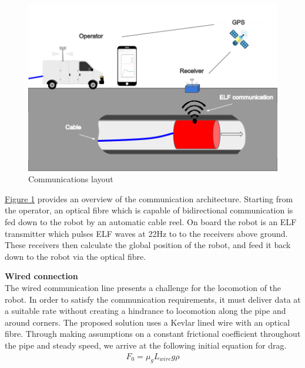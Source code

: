 \documentclass[11pt]{article}		%
\newcommand{\figref}[1]{\hyperref[#1]{Figure \ref*{#1}}}    %
\begin{document}
	        \begin{figure}[h]
				\centering
				\includegraphics[scale=1]{comms layout.pdf}
				\caption{Communications layout} %
				\label{commsLayout}
			\end{figure}
	        
	        \figref{commsLayout} provides an overview of the communication architecture. 
	        Starting from the operator, an optical fibre which is capable of bidirectional communication is fed down to the robot by an automatic cable reel. 
	        On board the robot is an ELF transmitter which pulses ELF waves at 22Hz to to the receivers above ground. 
	        These receivers then calculate the global position of the robot, and feed it back down to the robot via the optical fibre.
	       
	        \textbf{Wired connection}
	        \\
	        The wired communication line presents a challenge for the locomotion of the robot. 
	        In order to satisfy the communication requirements, it must deliver data at a suitable rate without creating a hindrance to locomotion along the pipe and around corners. 
	        The proposed solution uses a Kevlar lined wire with an optical fibre. 
	        Through making assumptions on a constant frictional coefficient throughout the pipe and steady speed, we arrive at the following initial equation for drag. 
	        \begin{align}
					F_0 = \mu_g L_{wire}   g \rho
			\end{align}
	        
	        
\end{document}
